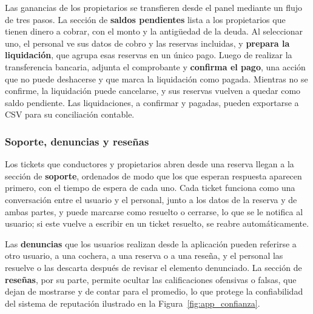Las ganancias de los propietarios se transfieren desde el panel mediante un flujo de tres pasos. La sección de \textbf{saldos pendientes} lista a los propietarios que tienen dinero a cobrar, con el monto y la antigüedad de la deuda. Al seleccionar uno, el personal ve sus datos de cobro y las reservas incluidas, y \textbf{prepara la liquidación}, que agrupa esas reservas en un único pago. Luego de realizar la transferencia bancaria, adjunta el comprobante y \textbf{confirma el pago}, una acción que no puede deshacerse y que marca la liquidación como pagada. Mientras no se confirme, la liquidación puede cancelarse, y sus reservas vuelven a quedar como saldo pendiente. Las liquidaciones, a confirmar y pagadas, pueden exportarse a CSV para su conciliación contable.


\FloatBarrier
\subsubsection{Soporte, denuncias y reseñas}

Los tickets que conductores y propietarios abren desde una reserva llegan a la sección de \textbf{soporte}, ordenados de modo que los que esperan respuesta aparecen primero, con el tiempo de espera de cada uno. Cada ticket funciona como una conversación entre el usuario y el personal, junto a los datos de la reserva y de ambas partes, y puede marcarse como resuelto o cerrarse, lo que se le notifica al usuario; si este vuelve a escribir en un ticket resuelto, se reabre automáticamente.


Las \textbf{denuncias} que los usuarios realizan desde la aplicación pueden referirse a otro usuario, a una cochera, a una reserva o a una reseña, y el personal las resuelve o las descarta después de revisar el elemento denunciado. La sección de \textbf{reseñas}, por su parte, permite ocultar las calificaciones ofensivas o falsas, que dejan de mostrarse y de contar para el promedio, lo que protege la confiabilidad del sistema de reputación ilustrado en la Figura~\ref{fig:app_confianza}.


